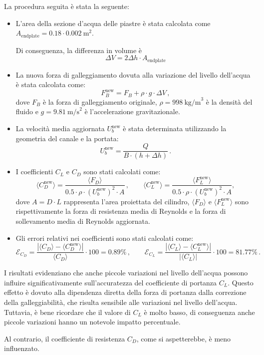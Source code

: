 La procedura seguita è stata la seguente:
\begin{itemize}
    \item L'area della sezione d'acqua delle piastre è stata calcolata come \(A_{\text{endplate}} = 0.18 \cdot 0.002 ~ \text{m}^2\).

    Di conseguenza, la differenza in volume è
    \begin{equation*}
    \Delta V = 2 \Delta h \cdot A_{\text{endplate}}
    \end{equation*} 

    \item La nuova forza di galleggiamento dovuta alla variazione del livello dell'acqua è stata calcolata come:
    \[
    F_B^{\text{new}} = F_B + \rho \cdot g \cdot \Delta V\,,
    \]
    dove \(F_B\) è la forza di galleggiamento originale, \(\rho = 998 ~ \text{kg/m}^3\) è la densità del fluido e \(g = 9.81 ~ \text{m/s}^2\) è l'accelerazione gravitazionale.

    \item La velocità media aggiornata \(U_b^{\text{new}}\) è stata determinata utilizzando la geometria del canale e la portata:
    \[
    U_b^{\text{new}} = \frac{Q}{B \cdot (h + \Delta h)}\,.
    \]

    \item I coefficienti \(C_L\) e \(C_D\) sono stati calcolati come:
    \[
    \langle C_D^{\text{new}} \rangle = \frac{\langle F_D\rangle}{0.5 \cdot \rho \cdot (U_b^{\text{new}})^2 \cdot A}\,, \qquad
    \langle C_L^{\text{new}}\rangle = \frac{\langle F_L^{\text{new}}\rangle}{0.5 \cdot \rho \cdot (U_b^{\text{new}})^2 \cdot A},
    \]
    dove \(A = D \cdot L\) rappresenta l'area proiettata del cilindro, \(\langle F_D \rangle\) e \(\langle F_L^{\text{new}} \rangle\) sono  rispettivamente la forza di resistenza media di Reynolds e la forza di sollevamento media di Reynolds aggiornata.

    \item Gli errori relativi nei coefficienti sono stati calcolati come:
    \[
    \mathcal{E}_{C_D} = \frac{|\langle C_D\rangle - \langle C_D^{\text{new}}\rangle|}{\langle C_D\rangle} \cdot 100=0.89\%\,, \qquad
    \mathcal{E}_{C_L} = \frac{|\langle C_L\rangle - \langle C_L^{\text{new}}\rangle|}{|\langle C_L\rangle|} \cdot 100=81.77\%\,.
    \]
\end{itemize}

I risultati evidenziano che anche piccole variazioni nel livello dell'acqua possono influire significativamente sull'accuratezza del coefficiente di portanza \(C_L\). Questo effetto è dovuto alla dipendenza diretta della forza di portanza dalla correzione della galleggiabilità, che risulta sensibile alle variazioni nel livello dell'acqua. Tuttavia, è bene ricordare che il valore di $C_L$ è molto basso, di conseguenza anche piccole variazioni hanno un notevole impatto percentuale.


 Al contrario, il coefficiente di resistenza \(C_D\), come si aspetterebbe, è meno influenzato.





